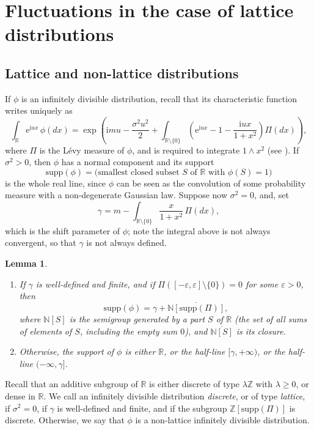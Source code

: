 \documentclass[12pt,a4paper,reqno]{amsart}
\newtheorem{lemma}{Lemma}[section]
\theoremstyle{remark}
\newcommand{\N}{\mathbb{N}}
\newcommand{\Z}{\mathbb{Z}}
\newcommand{\R}{\mathbb{R}}
\newcommand{\E}{\mathrm{e}}
\newcommand{\I}{\mathrm{i}}
\newcommand{\eps}{\varepsilon}
\newcommand{\supp}{\mathrm{supp}}
\begin{document}
\section{Fluctuations in the case of lattice distributions}\label{sec:lattice}

\subsection{Lattice and non-lattice distributions}
If $\phi$ is an infinitely divisible distribution, recall that its characteristic function writes uniquely as
\begin{equation}
\int_{\R} \E^{\I u x }\,\phi(dx)=\exp\left(\I m u - \frac{\sigma^2 u^2}{2}+\int_{\R \setminus \{0\}} \left(\E^{\I u x}-1-\frac{\I u x}{1+x^2}\right)\Pi(dx)\right),\label{eq:levykhintchine}
\end{equation}
where $\Pi$ is the L\'evy measure of $\phi$, and is required to integrate $1 \wedge x^2$ (see \cite[Chapter 13]{Kal97}). If $\sigma^2>0$, then $\phi$ has a normal component and its support 
$$\supp(\phi)=\big(\text{smallest closed subset $S$ of $\R$ with }\phi(S)=1\big)$$
is the whole real line, since $\phi$ can be seen as the convolution of some probability measure with a non-degenerate Gaussian law. Suppose now $\sigma^2=0$, and, set
$$\gamma=m-\int_{\R \setminus \{0\}} \frac{x}{1+x^2}\,\Pi(dx),$$
which is the shift parameter of $\phi$; note the integral above is not always convergent, so that $\gamma$ is not always defined.
\begin{lemma}\label{lem:support}
    \cite[Chapter 4, Theorem 8.4]{SVH04}
\begin{enumerate}
	\item If $\gamma$ is well-defined and finite, and if $\Pi([-\eps,\eps]\setminus \{0\})=0$ for some $\eps>0$, then 
	$$\supp(\phi)=\gamma + \overline{\N[\supp(\Pi)]},$$
	where $\N[S]$ is the semigroup generated by a part $S$ of $\R$ (the set of all sums of elements of $S$, including the empty sum $0$), and $\overline{\N[S]}$ is its closure.\vspace{2mm}
	\item Otherwise, the support of $\phi$ is either $\R$, or the half-line $[\gamma,+\infty)$, or the half-line $(-\infty,\gamma]$.
\end{enumerate}
\end{lemma}\bigskip

Recall that an additive subgroup of $\R$ is either discrete of type $\lambda \Z$ with $\lambda\geq 0$, or dense in $\R$. We call an infinitely divisible distribution {\em discrete}, or of type {\em lattice}, if $\sigma^2=0$, if $\gamma$ is well-defined and finite, and if the subgroup $\Z[\supp(\Pi)]$ is discrete. Otherwise, we say that $\phi$ is a non-lattice infinitely divisible distribution.
\end{document}
